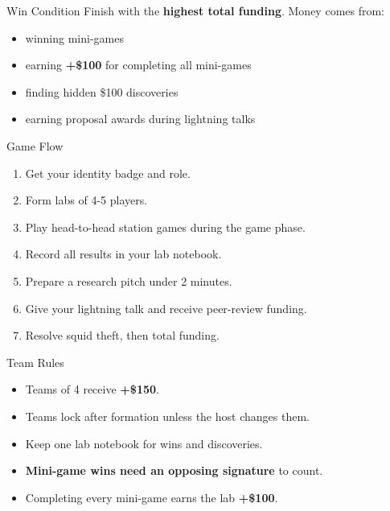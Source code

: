 \documentclass[12pt]{extarticle}
\begin{document}
\begin{minipage}[t]{0.492\textwidth}
\vspace{0pt}
\begin{labbox}{Win Condition}
Finish with the \textbf{highest total funding}. Money comes from:
\begin{itemize}
\item winning mini-games
\item earning \textbf{+\$100} for completing all mini-games
\item finding hidden \$100 discoveries
\item earning proposal awards during lightning talks
\end{itemize}
\end{labbox}

\begin{labbox}{Game Flow}
\begin{enumerate}
\item Get your identity badge and role.
\item Form labs of 4-5 players.
\item Play head-to-head station games during the game phase.
\item Record all results in your lab notebook.
\item Prepare a research pitch under 2 minutes.
\item Give your lightning talk and receive peer-review funding.
\item Resolve squid theft, then total funding.
\end{enumerate}
\end{labbox}

\begin{labbox}{Team Rules}
\begin{itemize}
\item Teams of 4 receive \textbf{+\$150}.
\item Teams lock after formation unless the host changes them.
\item Keep one lab notebook for wins and discoveries.
\item \textbf{Mini-game wins need an opposing signature} to count.
\item Completing every mini-game earns the lab \textbf{+\$100}.
\end{itemize}
\end{labbox}


\end{minipage}
\end{document}
